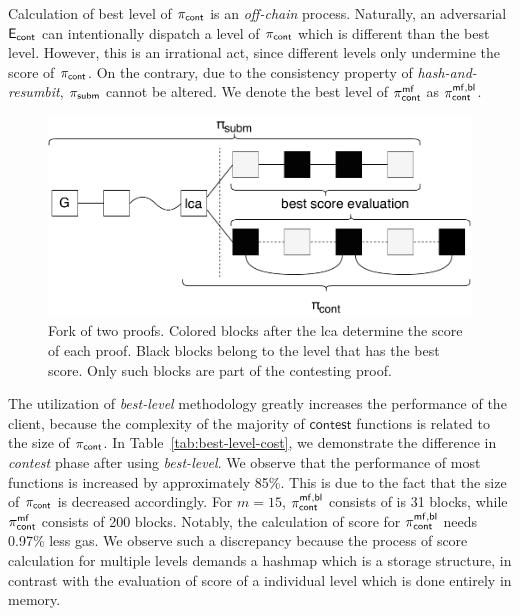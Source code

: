 Calculation of best level of $\mathsf{\pi_{cont}}$ is an \emph{off-chain} process. Naturally,
an adversarial $\mathsf{E_{cont}}$ can intentionally dispatch a level of $\mathsf{\pi_{cont}}$ which is
different than the best level. However, this is an irrational act, since
different levels only undermine the score of $\mathsf{\pi_{cont}}$. On the contrary, due to
the consistency property of \emph{hash-and-resumbit}, $\mathsf{\pi_{subm}}$ cannot be altered.
We denote the best level of $\mathsf{\pi_{cont}^{mf}}$ as $\mathsf{\pi_{cont}^{mf, bl}}$.

\begin{figure}[!h]
    \begin{center}
        \includegraphics[width=1\columnwidth]{figures/blocks-of-best-level.pdf}
    \end{center}
    \caption{Fork of two proofs. Colored blocks after the lca determine the
    score of each proof. Black blocks belong to the level that
    has the best score. Only such blocks are part of the contesting proof.}
    \label{fig:score-at-levels}
\end{figure}

The utilization of \emph{best-level} methodology greatly increases the
performance of the client, because the complexity of the majority of
$\textsf{contest}$ functions is related to the size of $\mathsf{\pi_{cont}}$. In
Table~\ref{tab:best-level-cost}, we demonstrate the difference in
\emph{contest} phase after using \emph{best-level}. We observe that the
performance of most functions is increased by approximately 85\%. This is due
to the fact that the size of $\mathsf{\pi_{cont}}$ is decreased accordingly. For $m=15$,
$\mathsf{\pi_{cont}^{mf, bl}}$ consists of is 31 blocks, while $\mathsf{\pi_{cont}^{mf}}$ consists of 200 blocks.
Notably, the calculation of score for $\mathsf{\pi_{cont}^{mf, bl}}$ needs 0.97\% less gas. We
observe such a discrepancy because the process of score calculation for
multiple levels demands a hashmap which is a storage structure, in contrast
with the evaluation of score of a individual level which is done entirely in
memory.

